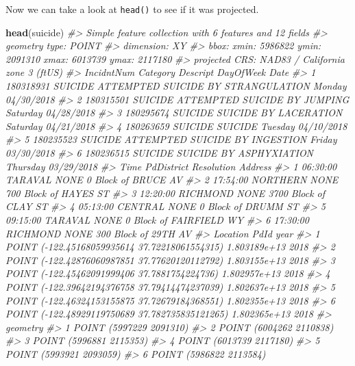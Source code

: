 \documentclass[
  12pt,
]{book}
\newenvironment{Shaded}{\begin{snugshade}}{\end{snugshade}}
\newcommand{\CommentTok}[1]{\textcolor[rgb]{0.37,0.37,0.37}{\textit{#1}}}
\newcommand{\KeywordTok}[1]{\textcolor[rgb]{0.27,0.27,0.27}{\textbf{#1}}}
\newcommand{\NormalTok}[1]{#1}
\begin{document}
Now we can take a look at \texttt{head()} to see if it was projected.

\begin{Shaded}
\begin{Highlighting}[]
\KeywordTok{head}\NormalTok{(suicide)}
\CommentTok{\#> Simple feature collection with 6 features and 12 fields}
\CommentTok{\#> geometry type:  POINT}
\CommentTok{\#> dimension:      XY}
\CommentTok{\#> bbox:           xmin: 5986822 ymin: 2091310 xmax: 6013739 ymax: 2117180}
\CommentTok{\#> projected CRS:  NAD83 / California zone 3 (ftUS)}
\CommentTok{\#>   IncidntNum Category                           Descript DayOfWeek       Date}
\CommentTok{\#> 1  180318931  SUICIDE ATTEMPTED SUICIDE BY STRANGULATION    Monday 04/30/2018}
\CommentTok{\#> 2  180315501  SUICIDE       ATTEMPTED SUICIDE BY JUMPING  Saturday 04/28/2018}
\CommentTok{\#> 3  180295674  SUICIDE              SUICIDE BY LACERATION  Saturday 04/21/2018}
\CommentTok{\#> 4  180263659  SUICIDE                            SUICIDE   Tuesday 04/10/2018}
\CommentTok{\#> 5  180235523  SUICIDE     ATTEMPTED SUICIDE BY INGESTION    Friday 03/30/2018}
\CommentTok{\#> 6  180236515  SUICIDE            SUICIDE BY ASPHYXIATION  Thursday 03/29/2018}
\CommentTok{\#>       Time PdDistrict Resolution                 Address}
\CommentTok{\#> 1 06:30:00    TARAVAL       NONE     0 Block of BRUCE AV}
\CommentTok{\#> 2 17:54:00   NORTHERN       NONE   700 Block of HAYES ST}
\CommentTok{\#> 3 12:20:00   RICHMOND       NONE   3700 Block of CLAY ST}
\CommentTok{\#> 4 05:13:00    CENTRAL       NONE     0 Block of DRUMM ST}
\CommentTok{\#> 5 09:15:00    TARAVAL       NONE 0 Block of FAIRFIELD WY}
\CommentTok{\#> 6 17:30:00   RICHMOND       NONE    300 Block of 29TH AV}
\CommentTok{\#>                                         Location         PdId year}
\CommentTok{\#> 1  POINT ({-}122.45168059935614 37.72218061554315) 1.803189e+13 2018}
\CommentTok{\#> 2  POINT ({-}122.42876060987851 37.77620120112792) 1.803155e+13 2018}
\CommentTok{\#> 3   POINT ({-}122.45462091999406 37.7881754224736) 1.802957e+13 2018}
\CommentTok{\#> 4  POINT ({-}122.39642194376758 37.79414474237039) 1.802637e+13 2018}
\CommentTok{\#> 5  POINT ({-}122.46324153155875 37.72679184368551) 1.802355e+13 2018}
\CommentTok{\#> 6 POINT ({-}122.48929119750689 37.782735835121265) 1.802365e+13 2018}
\CommentTok{\#>                  geometry}
\CommentTok{\#> 1 POINT (5997229 2091310)}
\CommentTok{\#> 2 POINT (6004262 2110838)}
\CommentTok{\#> 3 POINT (5996881 2115353)}
\CommentTok{\#> 4 POINT (6013739 2117180)}
\CommentTok{\#> 5 POINT (5993921 2093059)}
\CommentTok{\#> 6 POINT (5986822 2113584)}
\end{Highlighting}
\end{Shaded}
\end{document}
